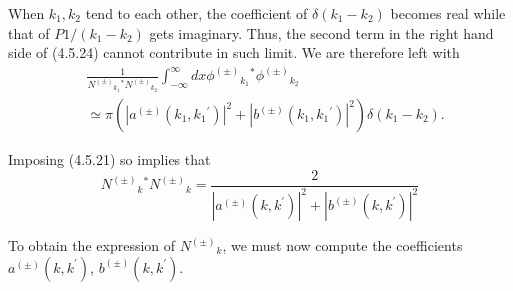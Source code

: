 \documentclass{article}
\begin{document}
When $k_{1}, k_{2}$ tend to each other, the coefficient of $\delta\left(k_{1}-k_{2}\right)$ becomes real while that of $P 1 /\left(k_{1}-k_{2}\right)$ gets imaginary. Thus, the second term in the right hand side of (4.5.24) cannot contribute in such limit. We are therefore left with
$$
\begin{align*}
& \frac{1}{N^{( \pm)}{ }_{k_{1}}{ }^{*} N^{( \pm)}{ }_{k_{2}}} \int_{-\infty}^{\infty} d x \phi^{( \pm)}{ }_{k_{1}}{ }^{*} \phi^{( \pm)}{ }_{k_{2}}  \tag{4.5.25}\\
& \simeq \pi\left(\left|a^{( \pm)}\left(k_{1}, k_{1}{ }^{\prime}\right)\right|^{2}+\left|b^{( \pm)}\left(k_{1}, k_{1}{ }^{\prime}\right)\right|^{2}\right) \delta\left(k_{1}-k_{2}\right) .
\end{align*}
$$

Imposing (4.5.21) so implies that
$$
\begin{equation*}
N^{( \pm)}{ }_{k}{ }^{*} N^{( \pm)}{ }_{k}=\frac{2}{\left|a^{( \pm)}\left(k, k^{\prime}\right)\right|^{2}+\left|b^{( \pm)}\left(k, k^{\prime}\right)\right|^{2}} \tag{4.5.26}
\end{equation*}
$$

To obtain the expression of $N^{( \pm)}{ }_{k}$, we must now compute the coefficients $a^{( \pm)}\left(k, k^{\prime}\right)$, $b^{( \pm)}\left(k, k^{\prime}\right)$.
\end{document}

